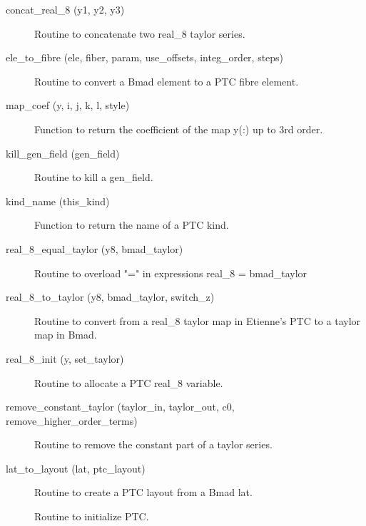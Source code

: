 \begin{description}

\label{r:concat.real.8}
\item[concat_real_8 (y1, y2, y3)] \Newline
Routine to concatenate two real_8 taylor series. 

\label{r:ele.to.fibre}
\item[ele_to_fibre (ele, fiber, param, use_offsets, integ_order, steps)] \Newline
Routine to convert a Bmad element to a PTC fibre element. 

\label{r:map.coef}
\item[map_coef (y, i, j, k, l, style)] \Newline
Function to return the coefficient of the map y(:) up to 3rd order. 

\label{r:kill.gen.field}
\item[kill_gen_field (gen_field)] \Newline
Routine to kill a gen_field. 

\label{r:kind.name}
\item[kind_name (this_kind)] \Newline
Function to return the name of a PTC kind. 

\label{r:real.8.equal.taylor}
\item[real_8_equal_taylor (y8, bmad_taylor)] \Newline
Routine to overload "=" in expressions real_8 = bmad_taylor 

\label{r:real.8.to.taylor}
\item[real_8_to_taylor (y8, bmad_taylor, switch_z)] \Newline
Routine to convert from a real_8 taylor map in Etienne's PTC to a taylor map in Bmad. 

\label{r:real.8.init}
\item[real_8_init (y, set_taylor)] \Newline
Routine to allocate a PTC real_8 variable. 

\label{r:remove.constant.taylor}
\item[remove_constant_taylor (taylor_in, taylor_out, c0, remove_higher_order_terms)] \Newline
Routine to remove the constant part of a taylor series. 

\label{r:lat.to.layout}
\item[lat_to_layout (lat, ptc_layout)] \Newline
Routine to create a PTC layout from a Bmad lat. 

\label{r:set.ptc}
\item[\protect\parbox{6.5in}{
    set_ptc (e_tot, particle, taylor_order, integ_order, n_step, no_cavity, \\
    \hspace*{1in} exact_calc, exact_misalign) }] \Newline
Routine to initialize PTC. 


\end{description}
